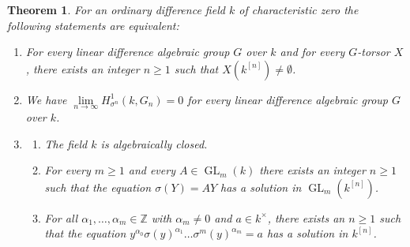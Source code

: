 \documentclass[oneside,reqno]{amsart}
\newtheorem{theo}{Theorem}[section]
\theoremstyle{definition}
\newcommand{\Gl}{\operatorname{GL}}
\newcommand{\s}{\sigma}
\newcommand{\kn}{k^{[n]}}
\begin{document}
\enlargethispage{5mm}

\begin{theo} \label{theo: main 2nd version}
	For an ordinary difference field $k$ of characteristic zero the following statements are equivalent:
\begin{enumerate}
	\item[\rm{(P1)}] For every linear difference algebraic group $G$ over $k$ and for every $G$-torsor $X$, there exists an integer $n\geq 1$ such that $X(\kn)\neq\emptyset$. 
	\item[\rm{(P2)}] We have $\lim\limits_{n\to \infty} H^1_{\s^n}(k,G_n)=0$ for every linear difference algebraic group $G$ over $k$.
		\item[\rm{(P3)}]		
	\begin{enumerate}
		\item[\rm{(a)}] The field $k$ is algebraically closed.
		\item[\rm{(b)}] For every $m\geq 1$ and every $A\in\Gl_m(k)$ there exists an integer $n\geq 1$ such that the equation $\s(Y)=AY$ has a solution in $\Gl_m(\kn)$. 	
		\item[\rm{(c)}] 
		For all $\alpha_1,\ldots,\alpha_m\in \mathbb{Z}$ with $\alpha_m\neq 0$ and $a\in k^\times$, there exists an $n\geq 1$ such that the equation $y^{\alpha_0}\s(y)^{\alpha_1}\ldots\s^m(y)^{\alpha_m}=a$
		has a solution in $\kn$.
	\end{enumerate}
\end{enumerate}
\end{theo}


\end{document}
